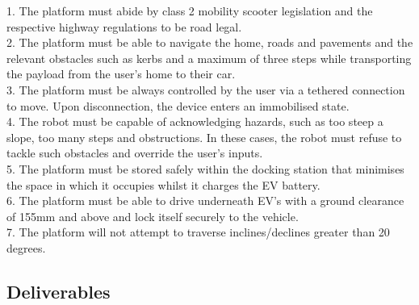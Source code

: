 \documentclass [12pt]{article}
\begin{document}
1.	The platform must abide by class 2 mobility scooter legislation and the respective highway regulations to be road legal. \\
2.	The platform must be able to navigate the home, roads and pavements and the relevant obstacles such as kerbs and a maximum of three steps while transporting the payload from the user’s home to their car. \\
3.	The platform must be always controlled by the user via a tethered connection to move. Upon disconnection, the device enters an immobilised state. \\
4.	The robot must be capable of acknowledging hazards, such as too steep a slope, too many steps and obstructions. In these cases, the robot must refuse to tackle such obstacles and override the user’s inputs. \\
5.	The platform must be stored safely within the docking station that minimises the space in which it occupies whilst it charges the EV battery. \\
6.	The platform must be able to drive underneath EV’s with a ground clearance of 155mm and above and lock itself securely to the vehicle. \\
7.	The platform will not attempt to traverse inclines/declines greater than 20 degrees. \\

\subsection{Deliverables}\label{sec:deliverables}
\end{document}
